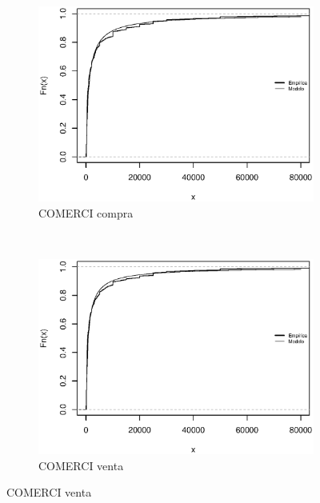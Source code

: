\documentclass[11pt]{article}
\numberwithin{equation}{section} %
\begin{document}
\begin{figure}[htbp]
\begin{subfigure}[b]{0.5\textwidth}
\centering
\includegraphics[width=\textwidth, trim=0 0.5cm 0 1cm]{comercivolumencompra.eps}
\caption{COMERCI compra}
\label{fig:comercivolumencompra}
\end{subfigure}%
~ %
\begin{subfigure}[b]{0.5\textwidth}
\centering
\includegraphics[width=\textwidth, trim=0 0.5cm 0 1cm]{comercivolumenventa.eps}
\caption{COMERCI venta}
\label{fig:comercivolumenventa}
\end{subfigure}


\end{figure}
\end{document}
